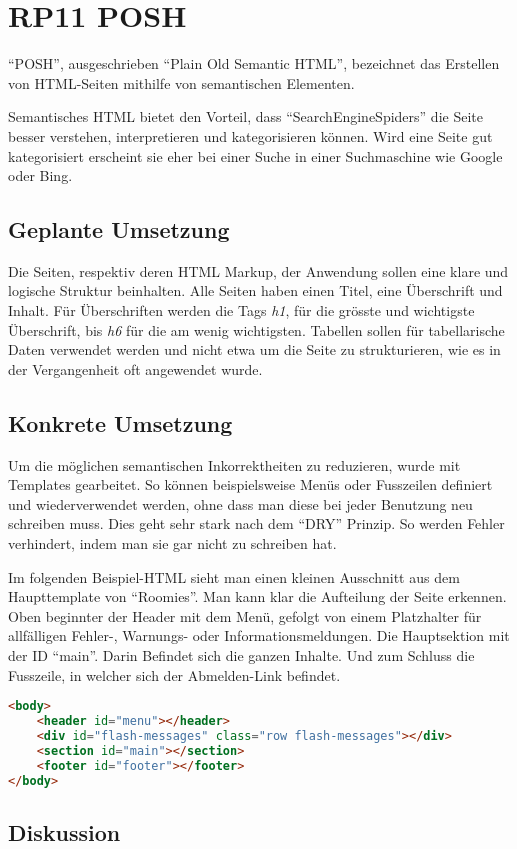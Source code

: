 \section{RP11 POSH}
\label{sec:principle-rp11-posh}

``POSH'', ausgeschrieben ``Plain Old Semantic HTML'', bezeichnet das Erstellen von HTML-Seiten mithilfe von semantischen Elementen. \cite{SemanticHTML}

Semantisches HTML bietet den Vorteil, dass ``\glspl{SearchEngineSpider}'' die Seite besser verstehen, interpretieren und kategorisieren können. Wird eine Seite gut kategorisiert erscheint sie eher bei einer Suche in einer Suchmaschine wie Google oder Bing.

\subsection*{Geplante Umsetzung}
Die Seiten, respektiv deren HTML Markup, der Anwendung sollen eine klare und logische Struktur beinhalten.
Alle Seiten haben einen Titel, eine Überschrift und Inhalt.
Für Überschriften werden die Tags \emph{h1}, für die grösste und wichtigste Überschrift, bis \emph{h6} für die am wenig wichtigsten.
Tabellen sollen für tabellarische Daten verwendet werden und nicht etwa um die Seite zu strukturieren, wie es in der Vergangenheit oft angewendet wurde.

\subsection*{Konkrete Umsetzung}
Um die möglichen semantischen Inkorrektheiten zu reduzieren, wurde mit Templates gearbeitet. So können beispielsweise Menüs oder Fusszeilen definiert und wiederverwendet werden, ohne dass man diese bei jeder Benutzung neu schreiben muss. Dies geht sehr stark nach dem ``\gls{DRY}'' Prinzip. So werden Fehler verhindert, indem man sie gar nicht zu schreiben hat.

Im folgenden Beispiel-HTML sieht man einen kleinen Ausschnitt aus dem Haupttemplate von ``Roomies''. Man kann klar die Aufteilung der Seite erkennen. Oben beginnter der Header mit dem Menü, gefolgt von einem Platzhalter für allfälligen Fehler-, Warnungs- oder Informationsmeldungen. Die Hauptsektion mit der ID ``main''. Darin Befindet sich die ganzen Inhalte. Und zum Schluss die Fusszeile, in welcher sich der Abmelden-Link befindet.

\begin{lstlisting}[language=HTML, caption=Layout Definition \cite{roomiesHtmlSkeleton}, label=lst:layoutDefinition, firstnumber=27]
<body>
	<header id="menu"></header>
	<div id="flash-messages" class="row flash-messages"></div>
	<section id="main"></section>
	<footer id="footer"></footer>
</body>
\end{lstlisting}

\subsection*{Diskussion}
